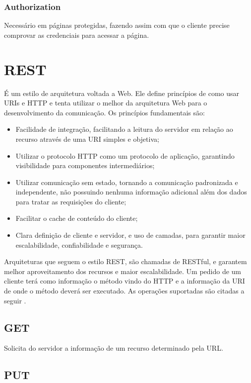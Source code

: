 \subsubsection{Authorization}
Necessário em páginas protegidas, fazendo assim com que o cliente precise comprovar as credenciais para acessar a página.

\section{REST}
É um estilo de arquitetura voltada a Web. Ele define princípios de como usar URIs e HTTP e tenta utilizar o melhor da arquitetura Web para o desenvolvimento da comunicação. Os princípios fundamentais são:

\begin{itemize}
	\item Facilidade de integração, facilitando a leitura do servidor em relação ao recurso através de uma URI simples e objetiva;
	\item Utilizar o protocolo HTTP como um protocolo de aplicação, garantindo visibilidade para componentes intermediários;	
	\item Utilizar comunicação sem estado, tornando a comunicação padronizada e independente, não possuindo nenhuma informação adicional além dos dados para tratar as requisições do cliente;
	\item Facilitar o cache de conteúdo do cliente;
	\item Clara definição de cliente e servidor, e uso de camadas, para garantir maior escalabilidade, confiabilidade e segurança.		
\end{itemize}
Arquiteturas que seguem o estilo REST, são chamadas de RESTful, e garantem melhor aproveitamento dos recursos e maior escalabilidade. Um pedido de um cliente terá como informação o método vindo do HTTP e a informação da URI de onde o método deverá ser executado. As operações suportadas são citadas a seguir\cite{fielding_rest} \cite{gomes_rest_url} .

\subsection{GET}
Solicita do servidor a informação de um recurso determinado pela URL.

\subsection{PUT}

